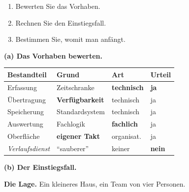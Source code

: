 \begin{aufgabe}
\begin{enumerate}[label=(\alph*)]
\item Bewerten Sie das Vorhaben.
\item Rechnen Sie den Einstiegsfall.
\item Bestimmen Sie, womit man anfängt.
\end{enumerate}

\loesung
\textbf{(a) Das Vorhaben bewerten.}

\begin{center}
{\small
\renewcommand{\arraystretch}{1.45}
\begin{tabular}{@{}P{2.4cm}P{2.2cm}P{2.2cm}P{1.8cm}@{}}
\toprule
\textbf{Bestandteil} & \textbf{Grund} & \textbf{Art} & \textbf{Urteil}\\
\midrule
Erfassung & Zeitschranke & \textbf{technisch} & \textcolor{gruen}{\textbf{ja}}\\
Übertragung & \textbf{Verfügbarkeit} & technisch & \textcolor{gruen}{ja}\\
Speicherung & Standard\-system & technisch & \textcolor{gruen}{ja}\\
Auswertung & Fachlogik & \textbf{fachlich} & \textcolor{gruen}{ja}\\
Oberfläche & \textbf{eigener Takt} & organisat. & \textcolor{gruen}{ja}\\
\midrule
\textit{Verlaufsdienst} & \textcolor{akzent}{\enquote{sauberer}} & \textcolor{akzent}{keiner} & \textcolor{akzent}{\textbf{nein}}\\
\bottomrule
\end{tabular}}
\end{center}

\begin{center}
\begin{minipage}{0.88\textwidth}
\end{minipage}
\end{center}

\medskip
\textbf{(b) Der Einstiegsfall.}

\textbf{Die Lage.} Ein kleineres Haus, ein Team von vier Personen.


\end{aufgabe}
